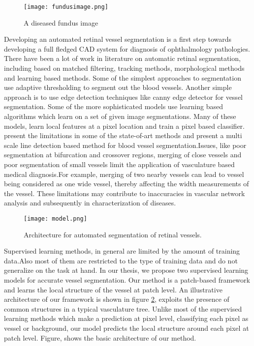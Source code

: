 \begin{figure}
	\centering	
	\texttt{[image: fundusimage.png]}
	\caption{A diseased fundus image}
	\label{fig:fundusdiseased}		
\end{figure}	

Developing an automated retinal vessel segmentation is a first step towards developing a full fledged CAD system for diagnosis of ophthalmology pathologies. There have been a lot of work in literature on automatic retinal segmentation, including based on matched filtering, tracking methods, morphological methods and learning based methods. Some of the simplest approaches to segmentation use adaptive thresholding to segment out the blood vessels. Another simple approach is to use edge detection techniques like canny edge detector for vessel segmentation. Some of the more sophisticated models use learning based algorithms which learn on a set of given image segmentations. Many of these models, learn local features at a pixel location and train a pixel based classifier.\citep{nguyen2011effective} present the limitations in some of the state-of-art methods and present a multi scale line detection based method for blood vessel segmentation.Issues, like poor segmentation at bifurcation and crossover regions, merging of close vessels and poor segmentation of small vessels limit the application of vasculature based medical diagnosis.For example, merging of two nearby vessels can lead to vessel being considered as one wide vessel, thereby affecting the width measurements of the vessel. These limitations may contribute to inaccuracies in vascular network analysis and subsequently in characterization of diseases. \\

\begin{figure}
	\centering	
	\texttt{[image: model.png]}
	\caption{Architecture for automated segmentation of retinal vessels.}
	\label{fig:basicmodel}		
\end{figure}
Supervised learning methods, in general are limited by the amount of training data.Also most of them are restricted to the type of training data and do not generalize on the task at hand. In our thesis, we propose two supervised learning models for accurate vessel segmentation. Our method is a patch-based framework and learns the local structure of the vessel at patch level. An illustrative architecture of our framework is shown in figure \ref{fig:basicmodel}, exploits the presence of common structures in a typical vasculature tree. Unlike most of the supervised learning methods which make a prediction at pixel level, classifying each pixel as vessel or background, our model predicts the local structure around each pixel at patch level. Figure, shows the basic architecture of our method.

